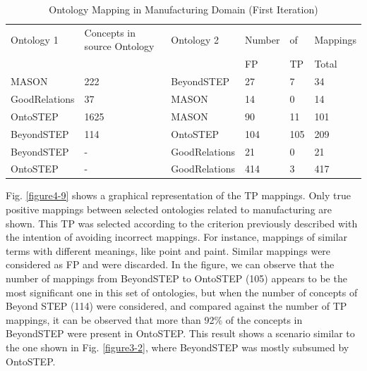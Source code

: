 \begin{table}[tp]%
	
	\caption{Ontology Mapping in Manufacturing Domain (First Iteration)}
	\label{table4.4}\centering
	\begin{tabular}{p{2.5cm} p{2cm} p{2.5cm} p{1.5cm} p{1cm} p{1.5cm}}\toprule
		
		Ontology 1 & Concepts in source Ontology &	Ontology 2	& Number & of & Mappings
		
		\\\cline{4-6}
		
		&	&	& FP & TP & Total  \\\toprule
		MASON &	222 &	BeyondSTEP  &	27 &	7&	34 \\\toprule
		GoodRelations&	37&	MASON&	14&	0&	14 \\\toprule
		OntoSTEP &	1625&	MASON&	90&	11&	101 \\\toprule
		BeyondSTEP	&114&	OntoSTEP&	104	&105&	209 \\\toprule
		BeyondSTEP  &			-&	GoodRelations&	21	&0&	21 \\\toprule
		OntoSTEP&	-&	GoodRelations&	414&	3&	417\\\toprule
	\end{tabular}
	
\end{table}





Fig. \ref{figure4-9} shows a graphical representation of the TP mappings.  Only true positive mappings  between selected ontologies related to manufacturing are shown. This TP was selected according to the criterion previously described with the intention of avoiding incorrect mappings. For instance, mappings of similar terms with different meanings, like point and paint. Similar mappings were considered as FP and were discarded. In the figure, we can observe that the number of mappings from BeyondSTEP to OntoSTEP (105) appears to be the most significant one in this set of ontologies, but when the number of concepts of Beyond STEP (114) were considered, and compared against the number of TP mappings, it can be observed that more than 92\% of the concepts in BeyondSTEP were present in OntoSTEP. This result shows a scenario similar to the one shown in Fig. \ref{figure3-2}, where BeyondSTEP was mostly subsumed by OntoSTEP.  


